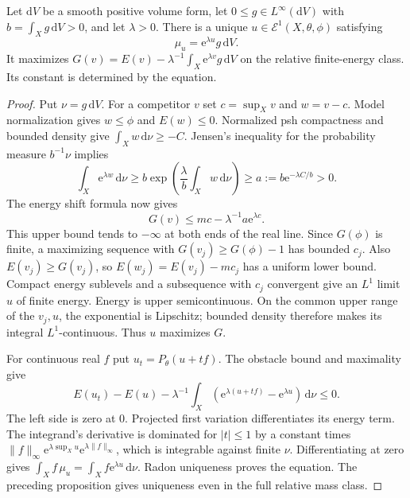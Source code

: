 \begin{theorem}\label{thm:bounded-density-relative-exponential-equation}
Let $\mathrm dV$ be a smooth positive volume form, let $0\leq g\in L^\infty(\mathrm dV)$ with $b=\int_Xg\,\mathrm dV>0$, and let $\lambda>0$. There is a unique
$u\in\mathcal E^1(X,\theta,\phi)$ satisfying
\[
 \mu_u=\mathrm e^{\lambda u}g\,\mathrm dV.
\]
It maximizes
$G(v)=E(v)-\lambda^{-1}\int_X\mathrm e^{\lambda v}g\,\mathrm dV$
on the relative finite-energy class. Its constant is determined by the equation.
\end{theorem}
\begin{proof}
Put $\nu=g\,\mathrm dV$. For a competitor $v$ set $c=\sup_Xv$ and $w=v-c$. Model normalization gives $w\leq\phi$ and $E(w)\leq0$. Normalized psh compactness and bounded density give $\int_Xw\,\mathrm d\nu\geq-C$. Jensen's inequality for the probability measure $b^{-1}\nu$ implies
\[
 \int_X\mathrm e^{\lambda w}\,\mathrm d\nu
   \geq b\exp\left(\frac\lambda b\int_Xw\,\mathrm d\nu\right)
   \geq a:=b\mathrm e^{-\lambda C/b}>0.
\]
The energy shift formula now gives
\[
 G(v)\leq mc-\lambda^{-1}a\mathrm e^{\lambda c}.
\]
This upper bound tends to $-\infty$ at both ends of the real line. Since $G(\phi)$ is finite, a maximizing sequence with $G(v_j)\geq G(\phi)-1$ has bounded $c_j$. Also $E(v_j)\geq G(v_j)$, so $E(w_j)=E(v_j)-mc_j$ has a uniform lower bound. Compact energy sublevels and a subsequence with $c_j$ convergent give an $L^1$ limit $u$ of finite energy. Energy is upper semicontinuous. On the common upper range of the $v_j,u$, the exponential is Lipschitz; bounded density therefore makes its integral $L^1$-continuous. Thus $u$ maximizes $G$.

For continuous real $f$ put $u_t=P_\theta(u+tf)$. The obstacle bound and maximality give
\[
 E(u_t)-E(u)-\lambda^{-1}
      \int_X\left(\mathrm e^{\lambda(u+tf)}-\mathrm e^{\lambda u}\right)
                         \,\mathrm d\nu\leq0.
\]
The left side is zero at $0$. Projected first variation differentiates its energy term. The integrand's derivative is dominated for $|t|\leq1$ by a constant times $\|f\|_\infty\mathrm e^{\lambda\sup_Xu}\mathrm e^{\lambda\|f\|_\infty}$, which is integrable against finite $\nu$. Differentiating at zero gives
$\int_Xf\,\mu_u=\int_Xf\mathrm e^{\lambda u}\,\mathrm d\nu$.
Radon uniqueness proves the equation. The preceding proposition gives uniqueness even in the full relative mass class.
\end{proof}

